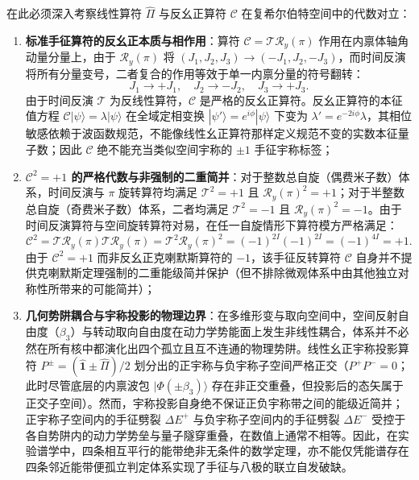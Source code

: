 在此必须深入考察线性算符 $\hat{\Pi}$ 与反幺正算符 $\mathcal{C}$ 在复希尔伯特空间中的代数对立：
\begin{enumerate}
\item \textbf{标准手征算符的反幺正本质与相作用}：算符 $\mathcal{C} = \mathcal{T} \mathcal{R}_y(\pi)$ 作用在内禀体轴角动量分量上，由于 $\mathcal{R}_y(\pi)$ 将 $(J_1, J_2, J_3) \to (-J_1, J_2, -J_3)$，而时间反演将所有分量变号，二者复合的作用等效于单一内禀分量的符号翻转：
\begin{equation}\label{eq:3-7-C-action}
J_1 \to +J_1, \quad J_2 \to -J_2, \quad J_3 \to +J_3.
\end{equation}
由于时间反演 $\mathcal{T}$ 为反线性算符，$\mathcal{C}$ 是严格的反幺正算符。反幺正算符的本征值方程 $\mathcal{C}|\psi\rangle = \lambda |\psi\rangle$ 在全域定相变换 $|\psi'\rangle = e^{i\phi}|\psi\rangle$ 下变为 $\lambda' = e^{-2i\phi}\lambda$，其相位敏感依赖于波函数规范，不能像线性幺正算符那样定义规范不变的实数本征量子数；因此 $\mathcal{C}$ 绝不能充当类似空间宇称的 $\pm 1$ 手征宇称标签；
\item \textbf{$\mathcal{C}^2 = +1$ 的严格代数与非强制的二重简并}：对于整数总自旋（偶费米子数）体系，时间反演与 $\pi$ 旋转算符均满足 $\mathcal{T}^2 = +1$ 且 $\mathcal{R}_y(\pi)^2 = +1$；对于半整数总自旋（奇费米子数）体系，二者均满足 $\mathcal{T}^2 = -1$ 且 $\mathcal{R}_y(\pi)^2 = -1$。由于时间反演算符与空间旋转算符对易，在任一自旋情形下算符模方严格满足：
\begin{equation}\label{eq:3-7-C-square}
\mathcal{C}^2 = \mathcal{T} \mathcal{R}_y(\pi) \mathcal{T} \mathcal{R}_y(\pi) = \mathcal{T}^2 \mathcal{R}_y(\pi)^2 = (-1)^{2I} (-1)^{2I} = (-1)^{4I} = +1.
\end{equation}
由于 $\mathcal{C}^2 = +1$ 而非反幺正克喇默斯算符的 $-1$，该手征反转算符 $\mathcal{C}$ 自身并不提供克喇默斯定理强制的二重能级简并保护（但不排除微观体系中由其他独立对称性所带来的可能简并）；
\item \textbf{几何势阱耦合与宇称投影的物理边界}：在多维形变与取向空间中，空间反射自由度（$\beta_3$）与转动取向自由度在动力学势能面上发生非线性耦合，体系并不必然在所有核中都演化出四个孤立且互不连通的物理势阱。线性幺正宇称投影算符 $P^\pm = (\hat{\mathbf{1}} \pm \hat{\Pi})/2$ 划分出的正宇称与负宇称子空间严格正交（$P^+ P^- = 0$；此时尽管底层的内禀波包 $|\Phi(\pm\beta_3)\rangle$ 存在非正交重叠，但投影后的态矢属于正交子空间）。然而，宇称投影自身绝不保证正负宇称带之间的能级近简并；正宇称子空间内的手征劈裂 $\Delta E^+$ 与负宇称子空间内的手征劈裂 $\Delta E^-$ 受控于各自势阱内的动力学势垒与量子隧穿重叠，在数值上通常不相等。因此，在实验谱学中，四条相互平行的能带绝非无条件的数学定理，亦不能仅凭能谱存在四条邻近能带便孤立判定体系实现了手征与八极的联立自发破缺。
\end{enumerate}

